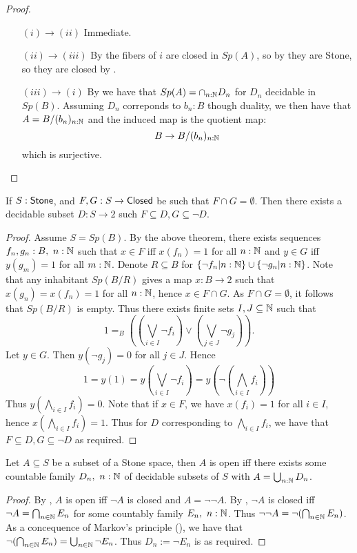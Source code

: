 \begin{proof}
\begin{itemize}
\item[$(i)\to (ii)$] Immediate.
\item[$(ii)\to (iii)$] By  the fibers of $i$ are closed in $Sp(A)$, so by  they are Stone, so they are closed by .
\item[$(iii)\to (i)$] By we have that $Sp(A) = \cap_{n:\mathbb{N}}D_n$ for $D_n$ decidable in $Sp(B)$. Assuming $D_n$ correponds to $b_n:B$ though duality, we then have that $A=B/ (b_n)_{n:\mathbb{N}}$ and the induced map is the quotient map:
$$B\to B/(b_n)_{n:\mathbb{N}}$$
which is surjective.
\end{itemize}
\end{proof}

\begin{lemma}\label{StoneSeperated}
  If $S:\mathsf{Stone} $, and $F,G:S \to \mathsf{Closed}$ be such that $F\cap G = \emptyset$. 
  Then there exists a decidable subset $D:S \to 2$ such $F\subseteq D, G \subseteq \neg D$. 
\end{lemma}
\begin{proof}
  Assume $S = Sp(B)$. 
  By the above theorem, there exists sequences $f_n,g_n:B,~n:\mathbb{N}$ such that 
  $x\in F$ iff $x(f_n) = 1$ for all $n:\mathbb{N}$ and 
  $y\in G$ iff $y(g_m) = 1$ for all $m:\mathbb{N}$. 
%
  Denote $R\subseteq B$ for $\{\neg f_n|n:\mathbb{N}\} \cup\{\neg g_n|n:\mathbb{N}\}$. 
  Note that any inhabitant $Sp(B/R)$ gives a map $x:B\to 2$ such that
  $x(g_n)= x(f_n) = 1$ for all $n:\mathbb{N}$, hence $x\in F \cap G$. 
  As $F\cap G = \emptyset $, it follows that $Sp(B/R)$ is empty.
%
  Thus there exists finite sets $I,J\subseteq \mathbb{N} $ such that 
  $$1 =_B ((\bigvee_{i\in I} \neg f_i) \vee (\bigvee_{j\in J} \neg g_j)).$$
%
  Let $y\in G$. Then $y(\neg g_j) = 0$ for all $j \in J$. 
  Hence 
  $$
  1 = y(1) 
  = 
  y(\bigvee_{i\in I} \neg f_i) = y (\neg (\bigwedge_{i\in I} f_i))
  $$
  Thus $y(\bigwedge_{i\in I} f_i) = 0$. 
  Note that if $x\in F$, we have $x(f_i) = 1$ for all $i\in I$, hence 
  $x(\bigwedge_{i\in I} f_i) = 1$. 
  Thus for $D$ corresponding to $\bigwedge_{i\in I} f_i$, we have that 
  $F\subseteq D, G\subseteq \neg D$ as required. 
\end{proof} 

\begin{corollary}\label{StoneOpenSubsets}
  Let $A\subseteq S$ be a subset of a Stone space, then 
  $A$ is open iff there exists some countable family $D_n,~n:\mathbb{N}$ of decidable subsets of $S$ with 
  $A = \bigcup_{n:\mathbb{N}} D_n$. 
\end{corollary}
\begin{proof}
  By , $A$ is open iff $\neg A$ is closed and $A = \neg \neg A$. 
  By , $\neg A$ is closed iff 
  $\neg A = \bigcap_{n\in \mathbb{N}} E_n$ for some countably family $E_n,~n:\mathbb{N}$. 
  Thus $\neg \neg A = \neg (\bigcap_{n\in \mathbb{N}} E_n)$. 
  As a concequence of Markov's principle (), we have that 
  $\neg (\bigcap_{n\in \mathbb{N}} E_n)= \bigcup_{n\in \mathbb{N}} \neg E_n$. 
  Thus $D_n := \neg E_n$ is as required. 
\end{proof}
